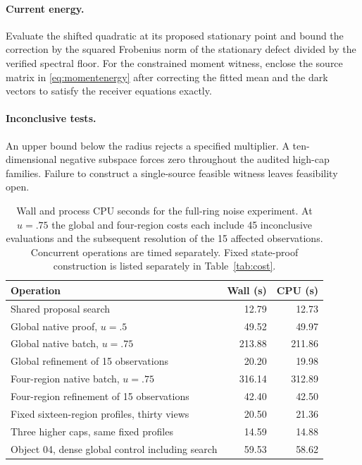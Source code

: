 \documentclass[anonymous,12pt]{iopjournal}
\theoremstyle{remark}\newtheorem{remark}[theorem]{Remark}
\numberwithin{equation}{section}
\begin{document}
\paragraph{Current energy.}
Evaluate the shifted quadratic at its proposed stationary point and bound the correction by the squared Frobenius norm of the stationary defect divided by the verified spectral floor. For the constrained moment witness, enclose the source matrix in \eqref{eq:momentenergy} after correcting the fitted mean and the dark vectors to satisfy the receiver equations exactly.

\paragraph{Inconclusive tests.}
An upper bound below the radius rejects a specified multiplier. A ten-dimensional negative subspace forces zero throughout the audited high-cap families. Failure to construct a single-source feasible witness leaves feasibility open.

\begin{table}[tb]
\caption{Wall and process CPU seconds for the full-ring noise experiment. At $u=.75$ the global and four-region costs each include 45 inconclusive evaluations and the subsequent resolution of the 15 affected observations. Concurrent operations are timed separately. Fixed state-proof construction is listed separately in Table~\ref{tab:cost}.}\label{tab:replay}
\centering\begin{tabular}{lrr}\toprule
Operation & Wall (s) & CPU (s)\\ \midrule
Shared proposal search &12.79&12.73\\
Global native proof, $u=.5$ &49.52&49.97\\
Global native batch, $u=.75$ &213.88&211.86\\
Global refinement of 15 observations &20.20&19.98\\
Four-region native batch, $u=.75$ &316.14&312.89\\
Four-region refinement of 15 observations &42.40&42.50\\
Fixed sixteen-region profiles, thirty views &20.50&21.36\\
Three higher caps, same fixed profiles &14.59&14.88\\
Object 04, dense global control including search &59.53&58.62\\ \bottomrule
\end{tabular}
\end{table}
\end{document}
